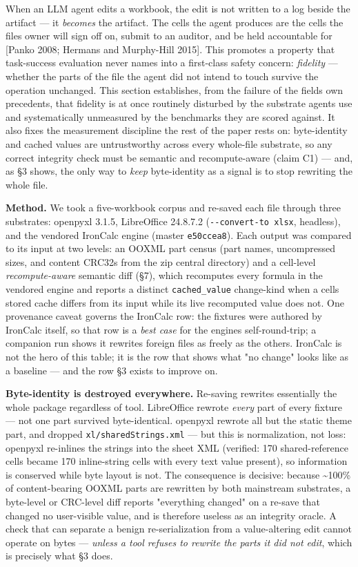 \documentclass[
]{article}
\begin{document}
When an LLM agent edits a workbook, the edit is not written to a log
beside the artifact --- it \emph{becomes} the artifact. The cells the
agent produces are the cells the file\textquotesingle s owner will sign
off on, submit to an auditor, and be held accountable for {[}Panko 2008;
Hermans and Murphy-Hill 2015{]}. This promotes a property that
task-success evaluation never names into a first-class safety concern:
\emph{fidelity} --- whether the parts of the file the agent did not
intend to touch survive the operation unchanged. This section
establishes, from the failure of the field\textquotesingle s own
precedents, that fidelity is at once routinely disturbed by the
substrate agents use and systematically unmeasured by the benchmarks
they are scored against. It also fixes the measurement discipline the
rest of the paper rests on: byte-identity and cached values are
untrustworthy across every whole-file substrate, so any correct
integrity check must be semantic and recompute-aware (claim C1) --- and,
as §3 shows, the only way to \emph{keep} byte-identity as a signal is to
stop rewriting the whole file.

\textbf{Method.} We took a five-workbook corpus and re-saved each file
through three substrates: openpyxl 3.1.5, LibreOffice 24.8.7.2
(\texttt{-\/-convert-to\ xlsx}, headless), and the vendored IronCalc
engine (master \texttt{e50ccea8}). Each output was compared to its input
at two levels: an OOXML part census (part names, uncompressed sizes, and
content CRC32s from the zip central directory) and a cell-level
\emph{recompute-aware} semantic diff (§7), which recomputes every
formula in the vendored engine and reports a distinct
\texttt{cached\_value} change-kind when a cell\textquotesingle s stored
cache differs from its input while its live recomputed value does not.
One provenance caveat governs the IronCalc row: the fixtures were
authored by IronCalc itself, so that row is a \emph{best case} for the
engine\textquotesingle s self-round-trip; a companion run shows it
rewrites foreign files as freely as the others. IronCalc is not the hero
of this table; it is the row that shows what "no change" looks like as a
baseline --- and the row §3 exists to improve on.

\textbf{Byte-identity is destroyed everywhere.} Re-saving rewrites
essentially the whole package regardless of tool. LibreOffice rewrote
\emph{every} part of every fixture --- not one part survived
byte-identical. openpyxl rewrote all but the static theme part, and
dropped \texttt{xl/sharedStrings.xml} --- but this is normalization, not
loss: openpyxl re-inlines the strings into the sheet XML (verified: 170
shared-reference cells became 170 inline-string cells with every text
value present), so information is conserved while byte layout is not.
The consequence is decisive: because \textasciitilde100\% of
content-bearing OOXML parts are rewritten by both mainstream substrates,
a byte-level or CRC-level diff reports "everything changed" on a re-save
that changed no user-visible value, and is therefore useless as an
integrity oracle. A check that can separate a benign re-serialization
from a value-altering edit cannot operate on bytes --- \emph{unless a
tool refuses to rewrite the parts it did not edit}, which is precisely
what §3 does.
\end{document}
